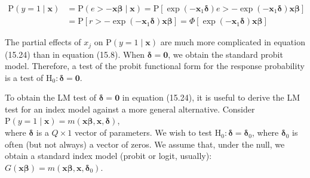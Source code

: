 \documentclass[10pt]{article}
\begin{document}
\begin{align*}
\mathrm{P}(y=1 \mid \mathbf{x}) & =\mathrm{P}(e>-\mathbf{x} \boldsymbol{\beta} \mid \mathbf{x})=\mathrm{P}\left[\exp \left(-\mathbf{x}_{1} \boldsymbol{\delta}\right) e>-\exp \left(-\mathbf{x}_{1} \boldsymbol{\delta}\right) \mathbf{x} \boldsymbol{\beta}\right] \\
& =\mathrm{P}\left[r>-\exp \left(-\mathbf{x}_{1} \boldsymbol{\delta}\right) \mathbf{x} \boldsymbol{\beta}\right]=\Phi\left[\exp \left(-\mathbf{x}_{1} \boldsymbol{\delta}\right) \mathbf{x} \boldsymbol{\beta}\right] \tag{15.24}
\end{align*}


The partial effects of $x_{j}$ on $\mathrm{P}(y=1 \mid \mathbf{x})$ are much more complicated in equation (15.24) than in equation (15.8). When $\boldsymbol{\delta}=\mathbf{0}$, we obtain the standard probit model. Therefore, a test of the probit functional form for the response probability is a test of $\mathrm{H}_{0}: \boldsymbol{\delta}=\mathbf{0}$.

To obtain the LM test of $\boldsymbol{\delta}=\mathbf{0}$ in equation (15.24), it is useful to derive the LM test for an index model against a more general alternative. Consider\\
$\mathrm{P}(y=1 \mid \mathbf{x})=m(\mathbf{x} \boldsymbol{\beta}, \mathbf{x}, \boldsymbol{\delta})$,\\
where $\boldsymbol{\delta}$ is a $Q \times 1$ vector of parameters. We wish to test $\mathrm{H}_{0}: \boldsymbol{\delta}=\boldsymbol{\delta}_{0}$, where $\boldsymbol{\delta}_{0}$ is often (but not always) a vector of zeros. We assume that, under the null, we obtain a standard index model (probit or logit, usually):\\
$G(\mathbf{x} \boldsymbol{\beta})=m\left(\mathbf{x} \boldsymbol{\beta}, \mathbf{x}, \boldsymbol{\delta}_{0}\right)$.
\end{document}
